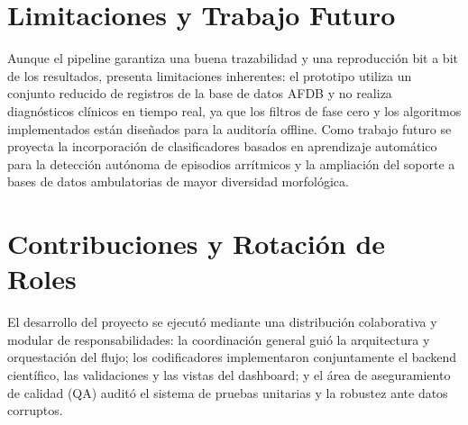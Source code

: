 \documentclass[11pt,a4paper]{article}
\begin{document}
\section{Limitaciones y Trabajo Futuro}
Aunque el pipeline garantiza una buena trazabilidad y una reproducción bit a bit de los resultados, presenta limitaciones inherentes: el prototipo utiliza un conjunto reducido de registros de la base de datos AFDB y no realiza diagnósticos clínicos en tiempo real, ya que los filtros de fase cero y los algoritmos implementados están diseñados para la auditoría offline. Como trabajo futuro se proyecta la incorporación de clasificadores basados en aprendizaje automático para la detección autónoma de episodios arrítmicos y la ampliación del soporte a bases de datos ambulatorias de mayor diversidad morfológica.

\section{Contribuciones y Rotación de Roles}
El desarrollo del proyecto se ejecutó mediante una distribución colaborativa y modular de responsabilidades: la coordinación general guió la arquitectura y orquestación del flujo; los codificadores implementaron conjuntamente el backend científico, las validaciones y las vistas del dashboard; y el área de aseguramiento de calidad (QA) auditó el sistema de pruebas unitarias y la robustez ante datos corruptos.
\end{document}
